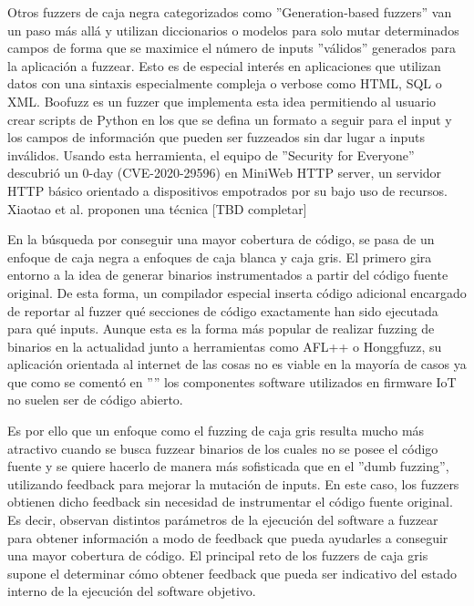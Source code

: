 Otros fuzzers de caja negra categorizados 
como ''Generation-based fuzzers''\cite{Felderer2016} van un paso más allá y utilizan diccionarios o modelos para solo 
mutar determinados campos de forma que se maximice el número de inputs ''válidos'' generados para la aplicación a fuzzear. Esto es de 
especial interés en aplicaciones que utilizan datos con una sintaxis especialmente compleja o verbose como HTML, SQL o XML.
Boofuzz\cite{boofuzz} es un fuzzer que implementa esta idea permitiendo al usuario crear scripts de Python en los que 
se defina un formato a seguir para el input y los campos de información que pueden ser fuzzeados sin dar lugar a inputs 
inválidos. Usando esta herramienta, el equipo de ''Security for Everyone'' descubrió un 0-day (CVE-2020-29596)\cite{securityforeveryone}
en MiniWeb HTTP server, un servidor HTTP básico orientado a dispositivos empotrados por su bajo uso de recursos.
Xiaotao et al.\cite{snipuzz} proponen una técnica [TBD completar]

En la búsqueda por conseguir una mayor cobertura de código, se pasa de un enfoque de caja negra a enfoques de caja blanca y caja gris.
El primero gira entorno a la idea de generar binarios instrumentados a partir del código fuente original. De esta forma, un compilador 
especial inserta código adicional encargado de reportar al fuzzer qué secciones de código exactamente han sido ejecutada para qué inputs.
Aunque esta es la forma más popular de realizar fuzzing de binarios en la actualidad junto a herramientas como AFL++ o Honggfuzz, su
aplicación orientada al internet de las cosas no es viable en la mayoría de casos ya que como se comentó en ''''
los componentes software utilizados en firmware IoT no suelen ser de código abierto.\bigskip

Es por ello que un enfoque como el fuzzing de caja gris resulta mucho más atractivo cuando se busca fuzzear binarios de los cuales no se 
posee el código fuente y se quiere hacerlo de manera más sofisticada que en el ''dumb fuzzing'', utilizando feedback para mejorar la mutación
de inputs. En este caso, los fuzzers obtienen dicho feedback sin necesidad de instrumentar el código fuente original.
Es decir, observan distintos parámetros de la ejecución del software a fuzzear para obtener información a modo de feedback que pueda ayudarles 
a conseguir una mayor cobertura de código. El principal reto de los fuzzers de caja gris supone el determinar cómo obtener feedback que pueda 
ser indicativo del estado interno de la ejecución del software objetivo. 

